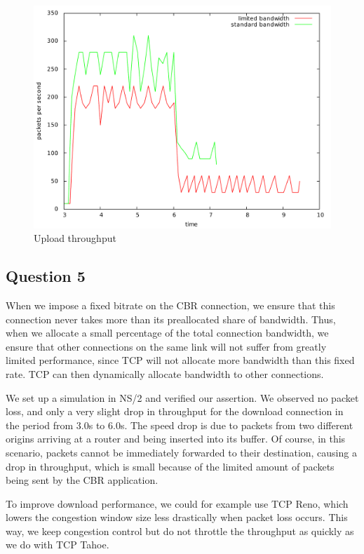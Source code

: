 \documentclass[10pt,a4paper]{article}
\begin{document}
\begin{figure}[p]
    \centering
    \includegraphics[width=\textwidth]{../part1/q4/plots/4-up.pdf}
    \caption{Upload throughput}
    \label{fig:up_limited}
\end{figure}

\subsection{Question 5}

When we impose a fixed bitrate on the CBR connection, we ensure that
this connection never takes more than its preallocated share of
bandwidth. Thus, when we allocate a small percentage of the total
connection bandwidth, we ensure that other connections on the same
link will not suffer from greatly limited performance, since TCP will
not allocate more bandwidth than this fixed rate. TCP can then
dynamically allocate bandwidth to other connections.


We set up a simulation in NS/2 and verified our assertion. We observed
no packet loss, and only a very slight drop in throughput for the
download connection in the period from 3.0s to 6.0s. The speed drop is
due to packets from two different origins arriving at a router and
being inserted into its buffer. Of course, in this scenario, packets
cannot be immediately forwarded to their destination, causing a drop
in throughput, which is small because of the limited amount of packets
being sent by the CBR application.

To improve download performance, we could for example use TCP Reno,
which lowers the congestion window size less drastically when packet
loss occurs. This way, we keep congestion control but do not throttle
the throughput as quickly as we do with TCP Tahoe.
\end{document}
